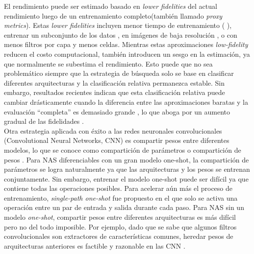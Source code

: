 El rendimiento puede ser estimado basado en \textit{lower fidelities} del actual rendimiento luego de un entrenamiento completo(también llamado \textit{proxy metrics}). Estas \textit{lower fidelities} incluyen menor tiempo de entrenamiento (\parencite{56} \parencite{57}), entrenar un subconjunto de los datos \parencite{58}, en imágenes de baja resolución \parencite{59}, o con menos filtros por capa y menos celdas. Mientras estas aproximaciones \textit{low-fidelity} reducen el costo computacional, también introducen un sesgo en la estimación, ya que normalmente se subestima el rendimiento. Esto puede que no sea problemático siempre que la estrategia de búsqueda solo se base en clasificar diferentes arquitecturas y la clasificación relativa permanezca estable. Sin embargo, resultados recientes indican que esta clasificación relativa puede cambiar drásticamente cuando la diferencia entre las aproximaciones baratas y la evaluación “completa” es demasiado grande \parencite{57}, lo que aboga por un aumento gradual de las fidelidades \parencite{60} \parencite{61}.\\

Otra estrategia aplicada con éxito a las redes neuronales convolucionales (Convolutional Neural Networks, CNN) es compartir pesos entre diferentes modelos, lo que se conoce como compartición de parámetros o compartición de pesos \parencite{62}. Para NAS diferenciables con un gran modelo one-shot, la compartición de parámetros se logra naturalmente ya que las arquitecturas y los pesos se entrenan conjuntamente. Sin embargo, entrenar el modelo one-shot puede ser difícil ya que contiene todas las operaciones posibles. Para acelerar aún más el proceso de entrenamiento, \textit{single-path one-shot} fue propuesto \parencite{63} en el que solo se activa una operación entre un par de entrada y salida durante cada paso. Para NAS sin un modelo \textit{one-shot}, compartir pesos entre diferentes arquitecturas es más difícil pero no del todo imposible. Por ejemplo, dado que se sabe que algunos filtros convolucionales son extractores de características comunes, heredar pesos de arquitecturas anteriores es factible y razonable en las CNN \parencite{64}. 



